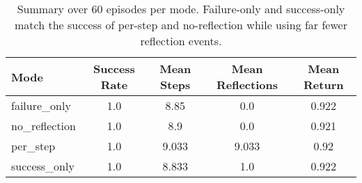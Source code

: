 
\begin{table}[t]
\centering
\caption{Summary over 60 episodes per mode. Failure-only and success-only match the success of per-step and no-reflection while using far fewer reflection events.}
\label{tab:summary}
\begin{tabular}{lcccc}
\toprule
Mode & Success Rate & Mean Steps & Mean Reflections & Mean Return \\
\midrule
failure_only & 1.0 & 8.85 & 0.0 & 0.922 \\
no_reflection & 1.0 & 8.9 & 0.0 & 0.921 \\
per_step & 1.0 & 9.033 & 9.033 & 0.92 \\
success_only & 1.0 & 8.833 & 1.0 & 0.922 \\
\bottomrule
\end{tabular}
\end{table}
